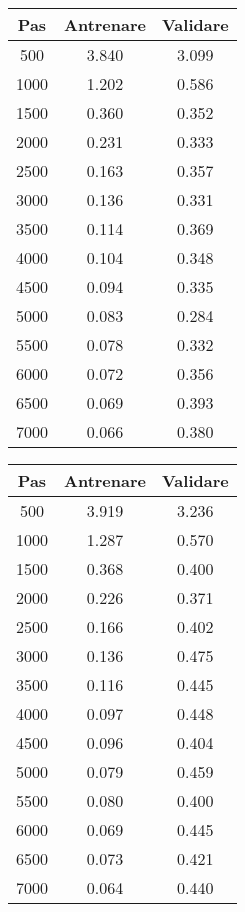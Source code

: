 \begin{figure}[h]
    \centering
    \begin{minipage}{.5\textwidth}
        \centering
        \captionsetup{justification=centering} 
        \label{tab:model-checkpoints1}
        \begin{tabular}{ccc}
        \toprule
        \textbf{Pas} & \textbf{Antrenare} & \textbf{Validare} \\
        \midrule
        500  & 3.840 & 3.099 \\
        1000 & 1.202 & 0.586 \\
        1500 & 0.360 & 0.352 \\
        2000 & 0.231 & 0.333 \\
        2500 & 0.163 & 0.357 \\
        3000 & 0.136 & 0.331 \\
        3500 & 0.114 & 0.369 \\
        4000 & 0.104 & 0.348 \\
        4500 & 0.094 & 0.335 \\
        5000 & 0.083 & 0.284 \\
        5500 & 0.078 & 0.332 \\
        6000 & 0.072 & 0.356 \\
        6500 & 0.069 & 0.393 \\
        7000 & 0.066 & 0.380 \\
        \bottomrule
        \end{tabular}
    \end{minipage}%
    \begin{minipage}{.5\textwidth}
        \centering
        \label{tab:model-checkpoints2}
        \begin{tabular}{ccc}
        \toprule
        \textbf{Pas} & \textbf{Antrenare} & \textbf{Validare} \\
        \midrule
        500  & 3.919 & 3.236 \\
        1000 & 1.287 & 0.570 \\
        1500 & 0.368 & 0.400 \\
        2000 & 0.226 & 0.371 \\
        2500 & 0.166 & 0.402 \\
        3000 & 0.136 & 0.475 \\
        3500 & 0.116 & 0.445 \\
        4000 & 0.097 & 0.448 \\
        4500 & 0.096 & 0.404 \\
        5000 & 0.079 & 0.459 \\
        5500 & 0.080 & 0.400 \\
        6000 & 0.069 & 0.445 \\
        6500 & 0.073 & 0.421 \\
        7000 & 0.064 & 0.440 \\
        \bottomrule
        \end{tabular}
    \end{minipage}
\end{figure}

